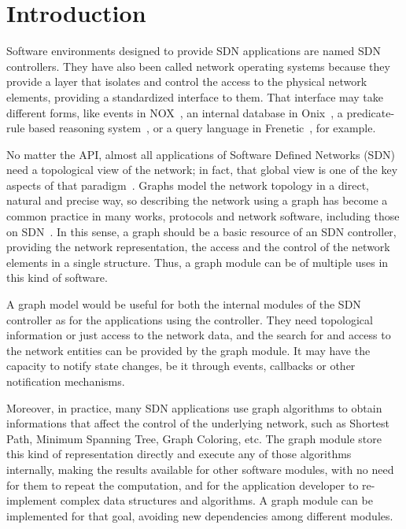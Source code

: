 \section{Introduction}
\label{sec:introduction}

Software environments designed to provide SDN applications
are named SDN controllers.
They have also been called network operating systems because they provide a layer
that
isolates and control the access to the physical network elements, providing
a standardized interface to them. That interface may take different forms,
like events in NOX~\cite{nox}, an internal database in Onix~\cite{teemu2010onix},
a predicate-rule based reasoning system~\cite{fml2009}, 
or a query language in Frenetic~\cite{Foster:2011:FNP:2034574.2034812},
for example.

No matter the API, 
almost all applications of Software Defined Networks (SDN)
need a topological view of the network; in
fact, that global view is one of the key aspects of that
paradigm~\citep{martin2010virtualizing}.
Graphs model the network topology in a direct, natural and precise way,
so describing the network using a graph has become a common practice in many works,
protocols and network software, including those on
SDN~\citep{ramya2012dynamic}.
In this sense, a graph should be a basic resource of an SDN controller,
providing the
network representation, the access and the control of the network elements in
a single structure. Thus, a graph module can be of multiple uses in this kind of
software.

A graph model would be useful for both the internal modules of the
SDN controller as for the applications using the controller.
They need topological information or just access to the network data,
and the search for and access to the network
entities can be provided by the graph module. 
It may have the capacity to notify state changes, be it through events,
callbacks or other notification mechanisms.

Moreover, in practice, many SDN applications use graph algorithms to obtain
informations that affect the control of the underlying network, such as
Shortest Path, Minimum Spanning Tree, Graph Coloring, etc.
The graph module store this kind of representation directly and execute any
of those algorithms internally,
making the results available for other software modules,
with no need for them to repeat the
computation, and for the application developer to re-implement 
complex data structures and algorithms.
A graph module can be implemented for that goal, avoiding new dependencies
among different modules.


